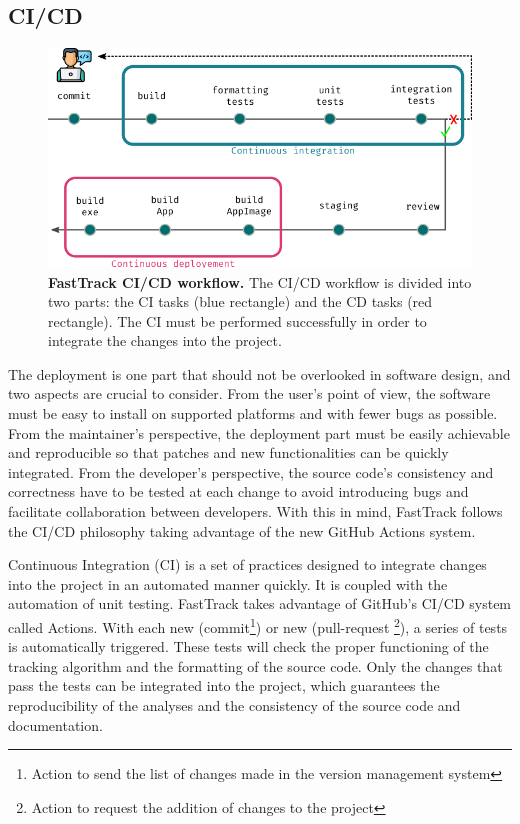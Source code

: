 		\subsection{CI/CD}

        \begin{figure}[h!]
        \centering
        \includegraphics[width=1\textwidth]{part_1/assets/Figure_cicd.png}
        \caption{{\bf FastTrack CI/CD workflow.} The CI/CD workflow is divided into two parts: the CI tasks (blue rectangle) and the CD tasks (red rectangle). The CI must be performed successfully in order to integrate the changes into the project.}
        \label{part_1:fig_cicd}
        \end{figure}

        The deployment is one part that should not be overlooked in software design, and two aspects are crucial to consider. From the user's point of view, the software must be easy to install on supported platforms and with fewer bugs as possible. From the maintainer's perspective, the deployment part must be easily achievable and reproducible so that patches and new functionalities can be quickly integrated. From the developer's perspective, the source code's consistency and correctness have to be tested at each change to avoid introducing bugs and facilitate collaboration between developers.  With this in mind, FastTrack follows the CI/CD philosophy \cite{shahin2017continuous}\cite{wikstrom2019benefits} taking advantage of the new GitHub Actions system.

        Continuous Integration (CI) is a set of practices designed to integrate changes into the project in an automated manner quickly. It is coupled with the automation of unit testing. FastTrack takes advantage of GitHub's CI/CD system called Actions. With each new (commit\footnote{Action to send the list of changes made in the version management system}) or new (pull-request \footnote{Action to request the addition of changes to the project}), a series of tests is automatically triggered. These tests will check the proper functioning of the tracking algorithm and the formatting of the source code. Only the changes that pass the tests can be integrated into the project, which guarantees the reproducibility of the analyses and the consistency of the source code and documentation.

